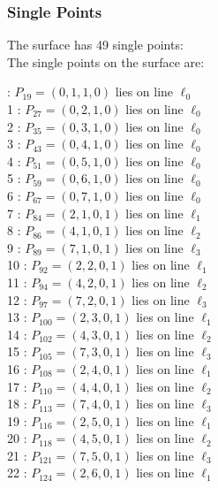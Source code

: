 \documentclass{article}
\begin{document}
{\subsubsection*{Single Points}
The surface has 49 single points:\\
The single points on the surface are:\\
\begin{multicols}{2}
 : $P_{19}=( 0, 1, 1, 0 )$ lies on line $\ell_{0}$\\
1 : $P_{27}=( 0, 2, 1, 0 )$ lies on line $\ell_{0}$\\
2 : $P_{35}=( 0, 3, 1, 0 )$ lies on line $\ell_{0}$\\
3 : $P_{43}=( 0, 4, 1, 0 )$ lies on line $\ell_{0}$\\
4 : $P_{51}=( 0, 5, 1, 0 )$ lies on line $\ell_{0}$\\
5 : $P_{59}=( 0, 6, 1, 0 )$ lies on line $\ell_{0}$\\
6 : $P_{67}=( 0, 7, 1, 0 )$ lies on line $\ell_{0}$\\
7 : $P_{84}=( 2, 1, 0, 1 )$ lies on line $\ell_{1}$\\
8 : $P_{86}=( 4, 1, 0, 1 )$ lies on line $\ell_{2}$\\
9 : $P_{89}=( 7, 1, 0, 1 )$ lies on line $\ell_{3}$\\
10 : $P_{92}=( 2, 2, 0, 1 )$ lies on line $\ell_{1}$\\
11 : $P_{94}=( 4, 2, 0, 1 )$ lies on line $\ell_{2}$\\
12 : $P_{97}=( 7, 2, 0, 1 )$ lies on line $\ell_{3}$\\
13 : $P_{100}=( 2, 3, 0, 1 )$ lies on line $\ell_{1}$\\
14 : $P_{102}=( 4, 3, 0, 1 )$ lies on line $\ell_{2}$\\
15 : $P_{105}=( 7, 3, 0, 1 )$ lies on line $\ell_{3}$\\
16 : $P_{108}=( 2, 4, 0, 1 )$ lies on line $\ell_{1}$\\
17 : $P_{110}=( 4, 4, 0, 1 )$ lies on line $\ell_{2}$\\
18 : $P_{113}=( 7, 4, 0, 1 )$ lies on line $\ell_{3}$\\
19 : $P_{116}=( 2, 5, 0, 1 )$ lies on line $\ell_{1}$\\
20 : $P_{118}=( 4, 5, 0, 1 )$ lies on line $\ell_{2}$\\
21 : $P_{121}=( 7, 5, 0, 1 )$ lies on line $\ell_{3}$\\
22 : $P_{124}=( 2, 6, 0, 1 )$ lies on line $\ell_{1}$\\

\end{multicols}}
\end{document}
